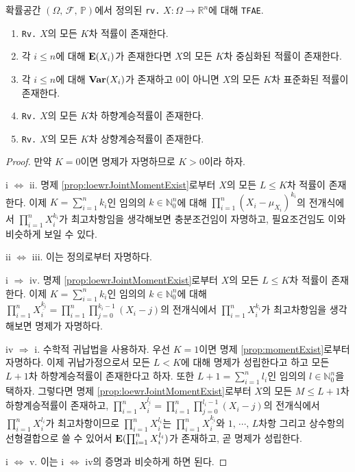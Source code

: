 \begin{proposition}
    확률공간 $(\Omega,\,\mathcal{F},\,\mathbb{P})$에서 정의된 \texttt{rv.} $X:\Omega\to\mathbb{R}^n$에 대해 \texttt{TFAE}.
    \begin{enumerate}
        \item \texttt{Rv.} $X$의 모든 $K$차 적률이 존재한다.
        \item 각 $i\leq n$에 대해 $\mathbf{E}(X_i)$가 존재한다면 $X$의 모든 $K$차 중심화된 적률이 존재한다.
        \item 각 $i\leq n$에 대해 $\mathbf{Var}(X_i)$가 존재하고 $0$이 아니면 $X$의 모든 $K$차 표준화된 적률이 존재한다.
        \item \texttt{Rv.} $X$의 모든 $K$차 하향계승적률이 존재한다.
        \item \texttt{Rv.} $X$의 모든 $K$차 상향계승적률이 존재한다.
    \end{enumerate}
\end{proposition}

\begin{proof}
    만약 $K=0$이면 명제가 자명하므로 $K>0$이라 하자.

    i $\Leftrightarrow$ ii. 명제 \ref{prop:loewrJointMomentExist}로부터 $X$의 모든 $L\leq K$차 적률이 존재한다. 이제 $K=\sum_{i=1}^nk_i$인 임의의 $k\in\mathbb{N}_0^n$에 대해 $\prod_{i=1}^n(X_i-\mu_{X_i})^{k_i}$의 전개식에서 $\prod_{i=1}^nX_i^{k_i}$가 최고차항임을 생각해보면 충분조건임이 자명하고, 필요조건임도 이와 비슷하게 보일 수 있다.

    ii $\Leftrightarrow$ iii. 이는 정의로부터 자명하다.

    i $\Rightarrow$ iv. 명제 \ref{prop:loewrJointMomentExist}로부터 $X$의 모든 $L\leq K$차 적률이 존재한다. 이제 $K=\sum_{i=1}^nk_i$인 임의의 $k\in\mathbb{N}_0^n$에 대해 $\prod_{i=1}^nX_i^{\underline{k_i}}=\prod_{i=1}^n\prod_{j=0}^{k_i-1}(X_i-j)$의 전개식에서 $\prod_{i=1}^nX_i^{k_i}$가 최고차항임을 생각해보면 명제가 자명하다.

    iv $\Rightarrow$ i. 수학적 귀납법을 사용하자. 우선 $K=1$이면 명제 \ref{prop:momentExist}로부터 자명하다. 이제 귀납가정으로서 모든 $L<K$에 대해 명제가 성립한다고 하고 모든 $L+1$차 하향계승적률이 존재한다고 하자. 또한 $L+1=\sum_{i=1}^nl_i$인 임의의 $l\in\mathbb{N}_0^n$을 택하자. 그렇다면 명제 \ref{prop:loewrJointMomentExist}로부터 $X$의 모든 $M\leq L+1$차 하향계승적률이 존재하고, $\prod_{i=1}^nX_i^{\underline{l_i}}=\prod_{i=1}^n\prod_{j=0}^{l_i-1}(X_i-j)$의 전개식에서 $\prod_{i=1}^nX_i^{l_i}$가 최고차항이므로 $\prod_{i=1}^nX_i^{l_i}$는 $\prod_{i=1}^nX_i^{\underline{k_i}}$와 $1,\,\cdots,\,L$차항 그리고 상수항의 선형결합으로 쓸 수 있어서 $\mathbf{E}(\prod_{i=1}^nX_i^{l_i})$가 존재하고, 곧 명제가 성립한다.

    i $\Leftrightarrow$ v. 이는 i $\Leftrightarrow$ iv의 증명과 비슷하게 하면 된다.
\end{proof}

